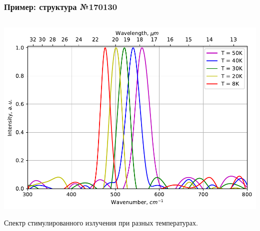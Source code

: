 \documentclass[9pt,pdf]{beamer}
\begin{document}
    \begin{frame}
        \frametitle{Пример: структура №170130}
        \begin{columns}
            \begin{column}{0.7\textwidth}
                \begin{overprint}
                    \begin{center}
                        \includegraphics[width=\textwidth]{images/18um_spectre.pdf}
                    \end{center}
                    Спектр стимулированного излучения при разных температурах.


\end{overprint}
\end{column}
\end{columns}
\end{frame}
\end{document}
